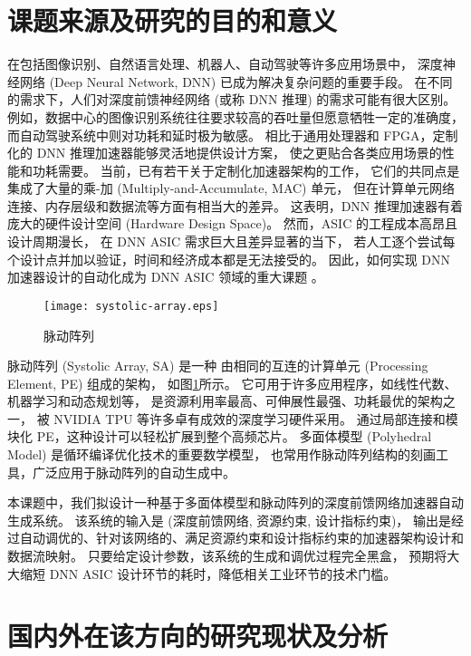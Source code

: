 \section{课题来源及研究的目的和意义}

在包括图像识别、自然语言处理、机器人、自动驾驶等许多应用场景中，
深度神经网络 (Deep Neural Network, DNN) 已成为解决复杂问题的重要手段。
在不同的需求下，人们对深度前馈神经网络 (或称 DNN 推理) 的需求可能有很大区别。
例如，数据中心的图像识别系统往往要求较高的吞吐量但愿意牺牲一定的准确度，
而自动驾驶系统中则对功耗和延时极为敏感。
相比于通用处理器和 FPGA，定制化的 DNN 推理加速器能够灵活地提供设计方案，
使之更贴合各类应用场景的性能和功耗需要。
当前，已有若干关于定制化加速器架构的工作，
它们的共同点是集成了大量的乘-加 (Multiply-and-Accumulate, MAC) 单元，
但在计算单元网络连接、内存层级和数据流等方面有相当大的差异。
这表明，DNN 推理加速器有着庞大的硬件设计空间 (Hardware Design Space)。
然而，ASIC 的工程成本高昂且设计周期漫长，
在 DNN ASIC 需求巨大且差异显著的当下，
若人工逐个尝试每个设计点并加以验证，时间和经济成本都是无法接受的。
因此，如何实现 DNN 加速器设计的自动化成为 DNN ASIC 领域的重大课题 \cite{capra_hardware_2020}。

\begin{figure}[htbp]
    \centering
    \texttt{[image: systolic-array.eps]}
    \caption{脉动阵列}
    \label{systolic-array}
\end{figure}

脉动阵列 (Systolic Array, SA) 是一种
由相同的互连的计算单元 (Processing Element, PE) 组成的架构，
如图\ref{systolic-array}所示。
它可用于许多应用程序，如线性代数\cite{moss_customizable_2018}、
机器学习\cite{jouppi_-datacenter_2017}和动态规划\cite{khailany_accelerating_2020}等，
是资源利用率最高、可伸展性最强、功耗最优的架构之一，
被 NVIDIA TPU 等许多卓有成效的深度学习硬件采用。
通过局部连接和模块化 PE，这种设计可以轻松扩展到整个高频芯片。
多面体模型 (Polyhedral Model) 是循环编译优化技术的重要数学模型\cite{hutchison_polyhedral_2010,rauchwerger_putting_2004}，
也常用作脉动阵列结构的刻画工具，广泛应用于脉动阵列的自动生成中。

本课题中，我们拟设计一种基于多面体模型和脉动阵列的深度前馈网络加速器自动生成系统。
该系统的输入是 (深度前馈网络, 资源约束, 设计指标约束)，
输出是经过自动调优的、针对该网络的、满足资源约束和设计指标约束的加速器架构设计和数据流映射。
只要给定设计参数，该系统的生成和调优过程完全黑盒，
预期将大大缩短 DNN ASIC 设计环节的耗时，降低相关工业环节的技术门槛。

\section{国内外在该方向的研究现状及分析}

